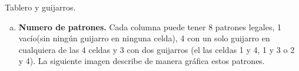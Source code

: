 \documentclass[12pt,a4paper]{article}
\makeatletter
\newcommand\Row[1]{%
  \par\nobreak\nointerlineskip\vskip-\fboxrule%
  \@tfor\@tempa:=#1 \do {\csname ChessBox\@tempa\endcsname\kern-\fboxrule}}
\newenvironment{Chessboard}[1][]
  {\setkeys{chessB}{#1}%
  \par\medskip\setlength\parindent{0pt}}
  {\par\medskip}
\makeatother
\begin{document}
\begin{section}{Tablero y guijarros.} \noindent 
\begin{enumerate}[a., nolistsep, font=\bfseries]
\setlength\multicolsep{0pt}
\item \textbf{Numero de patrones.} Cada columna puede tener 8 patrones legales, 1 vacío(sin ningún guijarro en ninguna celda), 4 con un solo guijarro en cualquiera de las 4 celdas y 3 con dos guijarros (el las celdas 1 y 4, 1 y 3 o 2 y 4). La siguiente imagen describe de manera gráfica estos patrones.  

\begin{center}
\end{center}


\end{enumerate}
\end{section}
\end{document}
